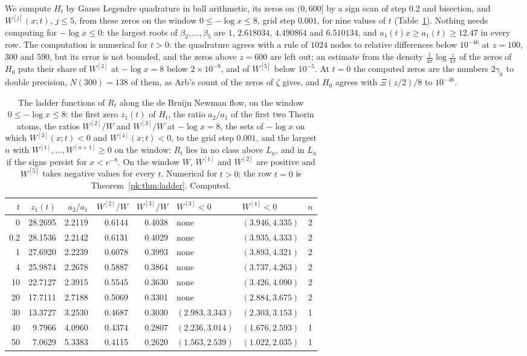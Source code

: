 We compute $H_t$ by Gauss Legendre quadrature in ball arithmetic, its zeros on $(0,600]$ by a sign scan of step $0.2$ and bisection, and $W^{[j]}(x;t)$, $j\le5$, from these zeros on the window $0\le-\log x\le8$, grid step $0.001$, for nine values of $t$ (Table~\ref{pk:tab:heatladder}). Nothing needs computing for $-\log x\le0$: the largest roots of $\beta_2,\dots,\beta_5$ are $1$, $2.618034$, $4.490864$ and $6.510134$, and $a_1(t)x\ge a_1(t)\ge12.47$ in every row. The computation is numerical for $t>0$: the quadrature agrees with a rule of $1024$ nodes to relative differences below $10^{-46}$ at $z=100$, $300$ and $590$, but its error is not bounded, and the zeros above $z=600$ are left out; an estimate from the density $\frac1{4\pi}\log\frac z{4\pi}$ of the zeros of $H_0$ puts their share of $W^{[3]}$ at $-\log x=8$ below $2\times10^{-9}$, and of $W^{[5]}$ below $10^{-5}$. At $t=0$ the computed zeros are the numbers $2\gamma_k$ to double precision, $N(300)=138$ of them, as Arb's count of the zeros of $\zeta$ gives, and $H_0$ agrees with $\Xi(z/2)/8$ to $10^{-46}$.

\begin{table}[htbp]
\centering\footnotesize
\begin{tabular}{rrrrrllc}
\toprule
$t$ & $z_1(t)$ & $a_2/a_1$ & $W^{[2]}/W$ & $W^{[3]}/W$ & $W^{[3]}<0$ & $W^{[4]}<0$ & $n$\\
\midrule
0 & 28.2695 & 2.2119 & 0.6144 & 0.4038 & none & $(3.946,4.335)$ & 2\\
0.2 & 28.1536 & 2.2142 & 0.6131 & 0.4029 & none & $(3.935,4.333)$ & 2\\
1 & 27.6920 & 2.2239 & 0.6078 & 0.3993 & none & $(3.893,4.321)$ & 2\\
4 & 25.9874 & 2.2678 & 0.5887 & 0.3864 & none & $(3.737,4.263)$ & 2\\
10 & 22.7127 & 2.3915 & 0.5545 & 0.3630 & none & $(3.426,4.090)$ & 2\\
20 & 17.7111 & 2.7188 & 0.5069 & 0.3301 & none & $(2.884,3.675)$ & 2\\
30 & 13.3727 & 3.2530 & 0.4687 & 0.3030 & $(2.983,3.343)$ & $(2.303,3.153)$ & 1\\
40 & 9.7966 & 4.0960 & 0.4374 & 0.2807 & $(2.236,3.014)$ & $(1.676,2.593)$ & 1\\
50 & 7.0629 & 5.3383 & 0.4115 & 0.2620 & $(1.563,2.539)$ & $(1.022,2.035)$ & 1\\
\bottomrule
\end{tabular}
\caption{The ladder functions of $R_t$ along the de Bruijn Newman flow, on the window $0\le-\log x\le8$: the first zero $z_1(t)$ of $H_t$, the ratio $a_2/a_1$ of the first two Thorin atoms, the ratios $W^{[2]}/W$ and $W^{[3]}/W$ at $-\log x=8$, the sets of $-\log x$ on which $W^{[3]}(x;t)<0$ and $W^{[4]}(x;t)<0$, to the grid step $0.001$, and the largest $n$ with $W^{[1]},\dots,W^{[n+1]}\ge0$ on the window: $R_t$ lies in no class above $L_n$, and in $L_n$ if the signs persist for $x<e^{-8}$. On the window $W$, $W^{[1]}$ and $W^{[2]}$ are positive and $W^{[5]}$ takes negative values for every $t$. Numerical for $t>0$; the row $t=0$ is Theorem~\ref{pk:thm:ladder}. Computed.}
\label{pk:tab:heatladder}
\end{table}

